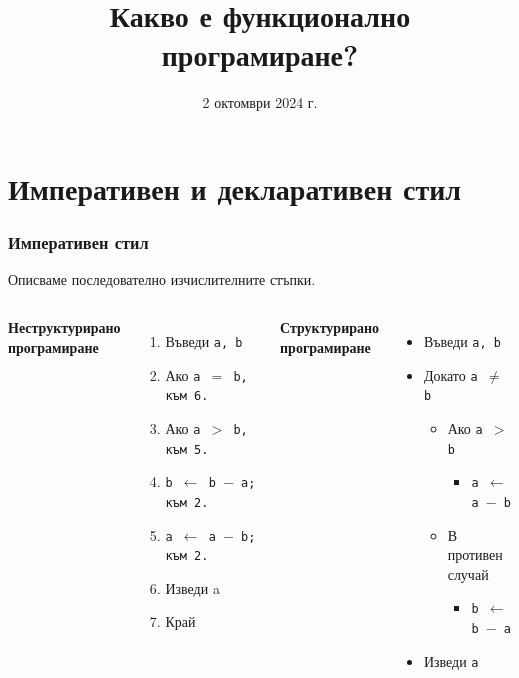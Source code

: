 \documentclass[alsotrans,beameroptions={aspectratio=169}]{beamerswitch}
\title[Какво е ФП?]{Какво е функционално програмиране?}
\date{2 октомври 2024 г.}
\begin{document}
\begin{frame}
  \titlepage
\end{frame}

\section*{Императивен и декларативен стил}

\begin{frame}
  \frametitle{Императивен стил}

  Описваме последователно изчислителните стъпки.\\[2ex]
  \begin{columns}[t,onlytextwidth]

    \textbf{Неструктурирано\\програмиране}\\[2ex]
    \begin{enumerate}
    \item Въведи \tt a, \tt b
    \item Ако \tt{a $=$ b}, към 6.
    \item Ако \tt{a $>$ b}, към 5.
    \item \tt{b $\leftarrow$ b $-$ a}; към 2.
    \item \tt{a $\leftarrow$ a $-$ b}; към 2.
    \item Изведи a
    \item Край
    \end{enumerate}

    \textbf{Структурирано\\програмиране}\\[2ex]
    \begin{itemize}
    \item Въведи \tt a, \tt b
    \item Докато \tt{a $\neq$ b}
      \begin{itemize}
      \item Ако \tt{a $>$ b}
        \begin{itemize}
        \item \tt{a $\leftarrow$ a $-$ b}
        \end{itemize}
      \item В противен случай
        \begin{itemize}
        \item \tt{b $\leftarrow$ b $-$ a}
        \end{itemize}
      \end{itemize}
    \item Изведи \tt a
    \end{itemize}

  \end{columns}
\end{frame}
\end{document}
